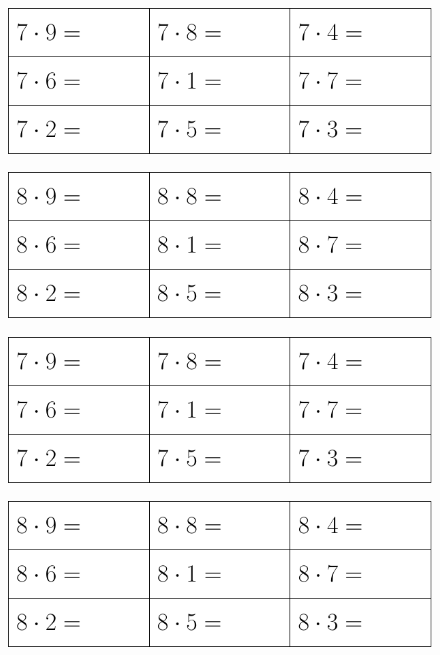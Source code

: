 

\renewcommand{\vs}{\vspace{40pt}}

	 \thispagestyle{empty}
\begin{figure}
	\includegraphics[]{g7}
\end{figure}
\vs
\begin{figure}
	\includegraphics[]{g8}
\end{figure}		
\vs
\begin{figure}
\includegraphics[]{g7}
\end{figure}
\vs
\begin{figure}
	\includegraphics[]{g8}
\end{figure}	







